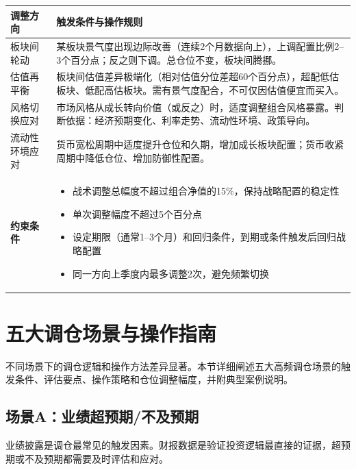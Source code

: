 \begin{exhibitbox}[表9-16：战术性调整的触发条件与约束]
\scriptsize
\setlength{\tabcolsep}{3pt}
\renewcommand{\arraystretch}{1.12}
\begin{tabularx}{\textwidth}{l X}
\toprule
\textbf{调整方向} & \textbf{触发条件与操作规则} \\
\midrule
板块间轮动 & 某板块景气度出现边际改善（连续2个月数据向上），上调配置比例2--3个百分点；反之则下调。总仓位不变，板块间腾挪。 \\
估值再平衡 & 板块间估值差异极端化（相对估值分位差超60个百分点），超配低估板块、低配高估板块。需有景气度配合，不可仅因估值便宜而买入。 \\
风格切换应对 & 市场风格从成长转向价值（或反之）时，适度调整组合风格暴露。判断依据：经济预期变化、利率走势、流动性环境、政策导向。 \\
流动性环境应对 & 货币宽松周期中适度提升仓位和久期，增加成长板块配置；货币收紧周期中降低仓位、增加防御性配置。 \\
\midrule
\textbf{约束条件} & 
\begin{itemize}[leftmargin=1.2em]
\item 战术调整总幅度不超过组合净值的15\%，保持战略配置的稳定性
\item 单次调整幅度不超过5个百分点
\item 设定期限（通常1--3个月）和回归条件，到期或条件触发后回归战略配置
\item 同一方向上季度内最多调整2次，避免频繁切换
\end{itemize}
\\
\bottomrule
\end{tabularx}
\end{exhibitbox}

\section{五大调仓场景与操作指南}

不同场景下的调仓逻辑和操作方法差异显著。本节详细阐述五大高频调仓场景的触发条件、评估要点、操作策略和仓位调整幅度，并附典型案例说明。

\subsection{场景A：业绩超预期/不及预期}

业绩披露是调仓最常见的触发因素。财报数据是验证投资逻辑最直接的证据，超预期或不及预期都需要及时评估和应对。

